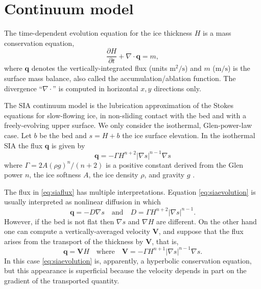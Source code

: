 \documentclass[twocolumn,letterpaper]{igs}
\newcommand\bq{\mathbf{q}}
\newcommand\bV{\mathbf{V}}
\newcommand{\Div}{\nabla\cdot}
\newcommand{\grad}{\nabla}
\begin{document}
\section*{Continuum model}

The time-dependent evolution equation for the ice thickness $H$ is a mass conservation equation,
\begin{equation}
\frac{\partial H}{\partial t} + \Div \bq = m,  \label{eq:siaevolution}
\end{equation}
where $\bq$ denotes the vertically-integrated flux (units $\text{m}^2/\text{s}$) and $m$ ($\text{m}/\text{s}$) is the surface mass balance, also called the accumulation/ablation function.  The divergence ``$\Div$'' is computed in horizontal $x,y$ directions only.

The SIA continuum model is the lubrication approximation \citep{Fowler1997} of the Stokes equations for slow-flowing ice, in non-sliding contact with the bed and with a freely-evolving upper surface.  We only consider the isothermal, Glen-power-law \citep{GreveBlatter2009} case.  Let $b$ be the bed and $s = H+b$ the ice surface elevation.  In the isothermal SIA the flux $\bq$ is given by
\begin{equation}
\bq = - \Gamma H^{n+2} |\grad s|^{n-1} \grad s  \label{eq:siaflux}
\end{equation}
where $\Gamma = 2 A (\rho g)^n / (n+2)$ is a positive constant derived from the Glen power $n$, the ice softness $A$, the ice density $\rho$, and gravity $g$ \citep{Bueleretal2005}.

The flux in \eqref{eq:siaflux} has multiple interpretations.  Equation \eqref{eq:siaevolution} is usually interpreted as nonlinear diffusion in which
\begin{equation}
\bq = - D \grad s \quad \text{and} \quad D =  \Gamma H^{n+2} |\grad s|^{n-1}. \label{eq:siafluxdiffusion}
\end{equation}
However, if the bed is not flat then $\grad s$ and $\grad H$ are different.  On the other hand one can compute a vertically-averaged velocity $\bV$, and suppose that the flux arises from the transport of the thickness by $\bV$, that is,
\begin{equation}
\bq = \bV H \quad \text{where} \quad \bV = - \Gamma H^{n+1} |\grad s|^{n-1} \grad s. \label{eq:siafluxvelocity}
\end{equation}
In this case \eqref{eq:siaevolution} is, apparently, a hyperbolic conservation equation, but this appearance is superficial because the velocity depends in part on the gradient of the transported quantity.
\end{document}
